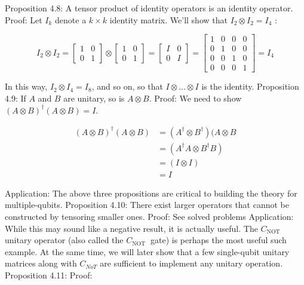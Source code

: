 \documentclass[main.tex]{subfiles}
\begin{document}
    Proposition 4.8: A tensor product of identity operators is an identity operator. Proof: Let $I_{k}$ denote a $k \times k$ identity matrix. We'll show that $I_{2} \otimes I_{2}=I_{4}$ :
    
    $$
    I_{2} \otimes I_{2}=\left[\begin{array}{ll}
    1 & 0 \\
    0 & 1
    \end{array}\right] \otimes\left[\begin{array}{ll}
    1 & 0 \\
    0 & 1
    \end{array}\right]=\left[\begin{array}{ll}
    I & 0 \\
    0 & I
    \end{array}\right]=\left[\begin{array}{llll}
    1 & 0 & 0 & 0 \\
    0 & 1 & 0 & 0 \\
    0 & 0 & 1 & 0 \\
    0 & 0 & 0 & 1
    \end{array}\right]=I_{4}
    $$
    
    In this way, $I_{2} \otimes I_{4}=I_{8}$, and so on, so that $I \otimes \ldots \otimes I$ is the identity. Proposition 4.9: If $A$ and $B$ are unitary, so is $A \otimes B$. Proof: We need to show $(A \otimes B)^{\dagger}(A \otimes B)=I$.
    
    $$
    \begin{aligned}
    (A \otimes B)^{\dagger}(A \otimes B) &=\left(A^{\dagger} \otimes B^{\dagger}\right)(A \otimes B\\
    &=\left(A^{\dagger} A \otimes B^{\dagger} B\right) \\
    &=(I \otimes I) \\
    &=I
    \end{aligned}
    $$
    
    Application: The above three propositions are critical to building the theory for multiple-qubits. Proposition 4.10: There exist larger operators that cannot be constructed by tensoring smaller ones. Proof: See solved problems Application: While this may sound like a negative result, it is actually useful. The $C_{\text {NOT }}$ unitary operator (also called the $C_{\text {NOT }}$ gate) is perhaps the most useful such example. At the same time, we will later show that a few single-qubit unitary matrices along with $C_{N o T}$ are sufficient to implement any unitary operation. Proposition 4.11: Proof:
    
\end{document}
